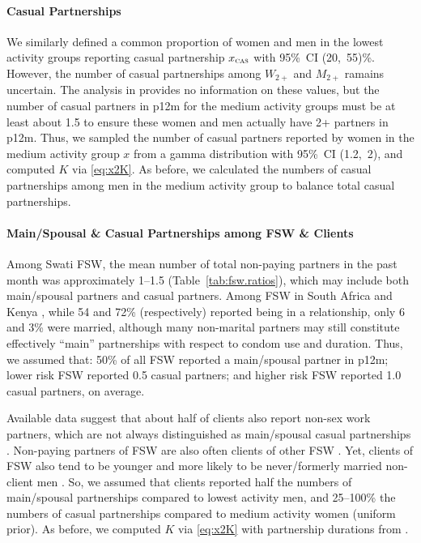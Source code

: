 \paragraph{Casual Partnerships}
We similarly defined a common proportion of women and men in the lowest activity groups
reporting casual partnership $x_{\textsc{cas}}$ with 95\%~CI (20,~55)\%.
However, the number of casual partnerships among $W_{2+}$ and $M_{2+}$ ramains uncertain.
The analysis in  provides no information on these values,
but the number of casual partners in p12m
for the medium activity groups must be at least about 1.5
to ensure these women and men actually have 2+ partners in p12m.
Thus, we sampled the number of casual partners
reported by women in the medium activity group $x$
from a gamma distribution with 95\%~CI (1.2,~2),
and computed $K$ via \eqref{eq:x2K}.
As before, we calculated the numbers of casual partnerships
among men in the medium activity group to balance total casual partnerships.
\paragraph{Main/Spousal \& Casual Partnerships among FSW \& Clients}
Among Swati FSW, the mean number of total non-paying partners in the past month was
approximately 1--1.5 (Table~\ref{tab:fsw.ratios}),
which may include both main/spousal partners and casual partners.
Among FSW in South Africa \cite{Wells2018} and Kenya \cite{Voeten2007},
while 54 and 72\% (respectively) reported being in a relationship, only 6 and 3\% were married,
although many non-marital partners may still constitute effectively ``main'' partnerships
with respect to condom use and duration.
Thus, we assumed that:
50\% of all FSW reported a main/spousal partner in p12m;
lower risk FSW reported 0.5 casual partners; and
higher risk FSW reported 1.0 casual partners, on average.
\par
Available data suggest that about half of clients also report non-sex work partners,
which are not always distinguished as main/spousal \vs casual partnerships
\cite{Lowndes2000,Santo2005}.
Non-paying partners of FSW are also often clients of other FSW \cite{Voeten2007,Godin2008}.
Yet, clients of FSW also tend to be younger and more likely to be
never/formerly married \vs non-client men \cite{Lowndes2000,Carael2006}.
So, we assumed that clients reported
half the numbers of main/spousal partnerships compared to lowest activity men, and
25--100\% the numbers of casual partnerships compared to medium activity women (uniform prior).
As before, we computed $K$ via \eqref{eq:x2K}
with partnership durations from .
